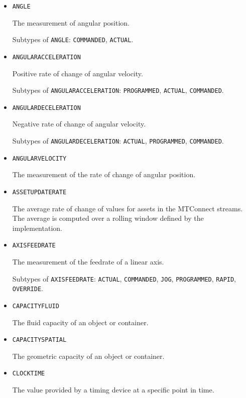 \begin{itemize}
\item \texttt{ANGLE}  

The measurement of angular position.

Subtypes of \texttt{ANGLE}: \texttt{COMMANDED}, \texttt{ACTUAL}.

\item \texttt{ANGULAR\textunderscore ACCELERATION}  

Positive rate of change of angular velocity.

Subtypes of \texttt{ANGULAR\textunderscore ACCELERATION}: \texttt{PROGRAMMED}, \texttt{ACTUAL}, \texttt{COMMANDED}.

\item \texttt{ANGULAR\textunderscore DECELERATION}  

Negative rate of change of angular velocity.

Subtypes of \texttt{ANGULAR\textunderscore DECELERATION}: \texttt{ACTUAL}, \texttt{PROGRAMMED}, \texttt{COMMANDED}.

\item \texttt{ANGULAR\textunderscore VELOCITY}  

The measurement of the rate of change of angular position.


\item \texttt{ASSET\textunderscore UPDATE\textunderscore RATE}  

The average rate of change of values for assets in the MTConnect streams. The average is computed over a rolling window defined by the implementation.


\item \texttt{AXIS\textunderscore FEEDRATE}  

The measurement of the feedrate of a linear axis.

Subtypes of \texttt{AXIS\textunderscore FEEDRATE}: \texttt{ACTUAL}, \texttt{COMMANDED}, \texttt{JOG}, \texttt{PROGRAMMED}, \texttt{RAPID}, \texttt{OVERRIDE}.

\item \texttt{CAPACITY\textunderscore FLUID}  

The fluid capacity of an object or container.


\item \texttt{CAPACITY\textunderscore SPATIAL}  

The geometric capacity of an object or container.


\item \texttt{CLOCK\textunderscore TIME}  

The value provided by a timing device at a specific point in time.



\end{itemize}
